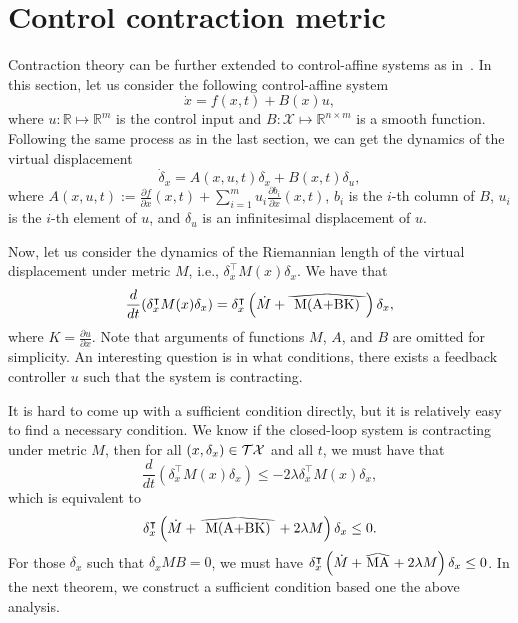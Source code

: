 \documentclass[12pt]{article}
\newcommand{\T}{\intercal}
\newcommand{\dx}{\delta_x}
\newcommand{\ddx}{\dot{\delta}_x}
\newcommand\reallywidehat[1]{%
\savestack{\tmpbox}{\stretchto{%
  \scaleto{%
    \scalerel*[\widthof{\ensuremath{#1}}]{\kern-.6pt\bigwedge\kern-.6pt}%
    {\rule[-\textheight/2]{1ex}{\textheight}}%
  }{\textheight}%
}{0.5ex}}%
\stackon[1pt]{#1}{\tmpbox}%
}
\newcommand{\reals}{\mathbb{R}}
\newcommand{\X}{\mathcal{X}}
\begin{document}
\section{Control contraction metric}
Contraction theory can be further extended to control-affine systems as in~\cite{manchester2017control}. In this section, let us consider the following control-affine system
\begin{equation}
\dot{x} = f(x, t) + B(x) u,
\label{eq:dyn_control}
\end{equation}
where $u: \reals \mapsto \reals^m$ is the control input and $B: \X \mapsto \reals^{n \times m}$ is a smooth function. Following the same process as in the last section, we can get the dynamics of the virtual displacement
\begin{equation}
\ddx = A(x,u,t) \dx + B(x,t) \delta_u,
\label{eq:dyn_control_vir}
\end{equation}
where $A(x,u,t) := \frac{\partial f}{\partial x}(x,t) + \sum_{i=1}^{m} u_i \frac{\partial b_i}{\partial x}(x, t)$,  $b_i$ is the $i$-th column of $B$,  $u_i$ is the $i$-th element of $u$, and $\delta_u$ is an infinitesimal displacement of $u$.

Now, let us consider the dynamics of the Riemannian length of the virtual displacement under metric $M$, i.e., $\dx^\T M(x) \dx$. We have that
\begin{equation}
\frac{d}{dt}(\dx^\T M(x) \dx) = \dx^\T \left(\dot{M} + \reallywidehat{M(A+BK)}\right) \dx,
\end{equation}
where $K = \frac{\partial u}{\partial x}$. Note that arguments of functions $M$, $A$, and $B$ are omitted for simplicity.
An interesting question is in what conditions, there exists a feedback controller $u$ such that the system is contracting.

It is hard to come up with a sufficient condition directly, but it is relatively easy to find a necessary condition. We know if the closed-loop system is contracting under metric $M$, then for all $(x, \dx) \in \Ta \X$ and all $t$, we must have that
\[
\frac{d}{dt}(\dx^\T M(x) \dx) \leq -2\lambda \dx^\T M(x) \dx,
\]
which is equivalent to
\begin{align*}
\dx^\T \left(\dot{M} + \reallywidehat{M(A+BK)} + 2\lambda M\right) \dx \leq 0.
\end{align*}
For those $\dx$ such that $\dx M B = 0$, we must have $\dx^\T \left(\dot{M} + \reallywidehat{MA} + 2\lambda M\right) \dx \leq 0$. In the next theorem, we construct a sufficient condition based one the above analysis.
\end{document}
